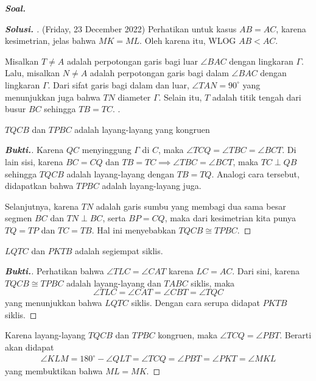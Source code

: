 \textbf{\textit{Soal. }}

\begin{proof}[\textbf{Solusi. }] (Friday, 23 December 2022) Perhatikan untuk kasus $AB=AC$, karena kesimetrian, jelas bahwa $MK=ML$. Oleh karena itu, WLOG $AB < AC$.
    
Misalkan  $T \neq A$ adalah perpotongan garis bagi luar $\angle BAC$ dengan lingkaran $\Gamma$. Lalu, misalkan $N \neq A$ adalah perpotongan garis bagi dalam $\angle BAC$ dengan lingkaran $\Gamma$.
Dari sifat garis bagi dalam dan luar, $\angle TAN = 90^\circ$ yang menunjukkan juga bahwa $TN$ diameter $\Gamma$. Selain itu, $T$ adalah titik tengah dari busur $BC$ sehingga $TB=TC$. . 

\begin{lemmarev}
    $TQCB$ dan $TPBC$ adalah layang-layang yang kongruen
    \begin{proof}[\textbf{Bukti.}]
        Karena $QC$ menyinggung $\Gamma$ di $C$, maka $\angle TCQ = \angle TBC = \angle BCT$. Di lain sisi, karena $BC=CQ$ dan $TB=TC \implies \angle TBC = \angle BCT$, maka $TC \perp QB$ sehingga $TQCB$ adalah layang-layang dengan $TB=TQ$. Analogi cara tersebut, didapatkan bahwa $TPBC$ adalah layang-layang juga.

        Selanjutnya, karena $TN$ adalah garis sumbu yang membagi dua sama besar segmen $BC$ dan $TN \perp BC$, serta $BP=CQ$, maka dari kesimetrian kita punya $TQ=TP$ dan $TC=TB$. Hal ini menyebabkan $TQCB \cong TPBC$.    \end{proof}
\end{lemmarev}

\begin{lemmarev}
    $LQTC$ dan $PKTB$ adalah segiempat siklis.
    \begin{proof}[\textbf{Bukti.}]
        Perhatikan bahwa $\angle TLC = \angle CAT$ karena $LC = AC$. Dari sini, karena $TQCB \cong TPBC$ adalah layang-layang dan $TABC$ siklis, maka
        $$\angle TLC = \angle CAT = \angle CBT = \angle TQC$$
        yang menunjukkan bahwa $LQTC$ siklis. Dengan cara serupa didapat $PKTB$ siklis.
    \end{proof}
\end{lemmarev}

Karena layang-layang $TQCB$ dan $TPBC$ kongruen, maka $\angle TCQ = \angle PBT$. Berarti akan didapat
\begin{align*}
    \angle KLM = 180^\circ - \angle QLT = \angle TCQ = \angle PBT = \angle PKT = \angle MKL
\end{align*}
yang membuktikan bahwa $ML=MK$.

\end{proof}